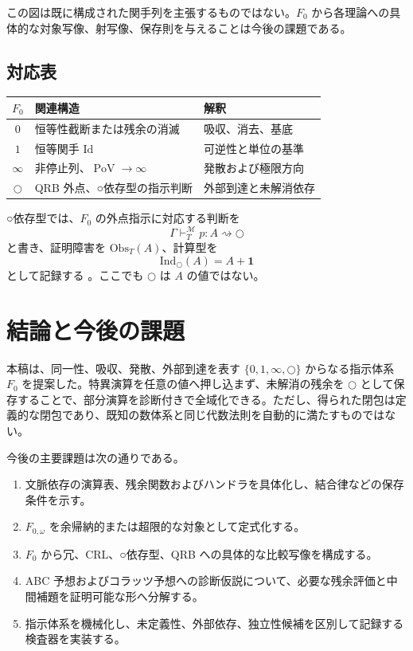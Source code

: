 \documentclass[a4paper,11pt]{ltjsarticle}
\theoremstyle{definition}
\theoremstyle{plain}
\newcommand{\dfix}{\bigcirc}
\newcommand{\Fzero}{F_{0}}
\newcommand{\Fomega}{F_{0,\omega}}
\newcommand{\PoV}{\operatorname{PoV}}
\newcommand{\Obs}{\mathrm{Obs}}
\newcommand{\Ind}{\mathrm{Ind}_{\dfix}}
\begin{document}
この図は既に構成された関手列を主張するものではない。$\Fzero$ から各理論への具体的な対象写像、射写像、保存則を与えることは今後の課題である。

\subsection{対応表}

\begin{center}
\begin{tabular}{c p{} p{}}
\toprule
$\Fzero$ & 関連構造 & 解釈 \\
\midrule
$0$ & 恒等性截断または残余の消滅 & 吸収、消去、基底 \\
$1$ & 恒等関手 $\mathrm{Id}$ & 可逆性と単位の基準 \\
$\infty$ & 非停止列、$\PoV\to\infty$ & 発散および極限方向 \\
$\dfix$ & QRB 外点、○依存型の指示判断 & 外部到達と未解消依存 \\
\bottomrule
\end{tabular}
\end{center}

○依存型では、$\Fzero$ の外点指示に対応する判断を
\[
 \Gamma\vdash_T^{\mathcal M}p:A\rightsquigarrow\dfix
\]
と書き、証明障害を $\Obs_T(A)$、計算型を
\[
 \Ind(A)=A+\mathbf{1}
\]
として記録する \cite{ChibaEPMDTT2026}。ここでも $\dfix$ は $A$ の値ではない。

\section{結論と今後の課題}

本稿は、同一性、吸収、発散、外部到達を表す $\{0,1,\infty,\dfix\}$ からなる指示体系 $\Fzero$ を提案した。特異演算を任意の値へ押し込まず、未解消の残余を $\dfix$ として保存することで、部分演算を診断付きで全域化できる。ただし、得られた閉包は定義的な閉包であり、既知の数体系と同じ代数法則を自動的に満たすものではない。

今後の主要課題は次の通りである。
\begin{enumerate}
 \item 文脈依存の演算表、残余関数およびハンドラを具体化し、結合律などの保存条件を示す。
 \item $\Fomega$ を余帰納的または超限的な対象として定式化する。
 \item $\Fzero$ から冗、CRL、○依存型、QRB への具体的な比較写像を構成する。
 \item ABC 予想およびコラッツ予想への診断仮説について、必要な残余評価と中間補題を証明可能な形へ分解する。
 \item 指示体系を機械化し、未定義性、外部依存、独立性候補を区別して記録する検査器を実装する。
\end{enumerate}



\end{document}
